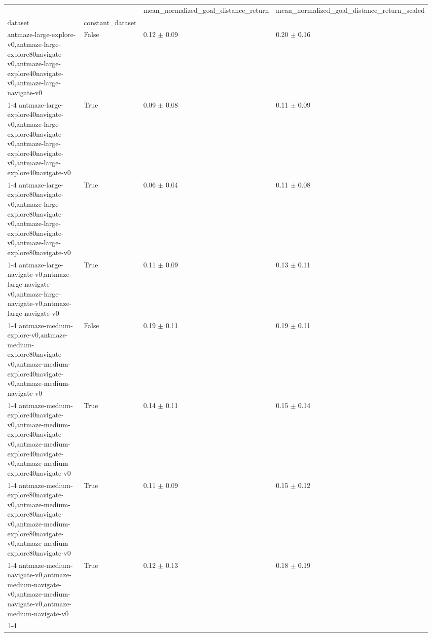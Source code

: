 \begin{tabular}{llll}
\toprule
 &  & mean_normalized_goal_distance_return & mean_normalized_goal_distance_return_scaled \\
dataset & constant_dataset &  &  \\
\midrule
antmaze-large-explore-v0,antmaze-large-explore80navigate-v0,antmaze-large-explore40navigate-v0,antmaze-large-navigate-v0 & False & 0.12 $\pm$ 0.09 & 0.20 $\pm$ 0.16 \\
\cline{1-4}
antmaze-large-explore40navigate-v0,antmaze-large-explore40navigate-v0,antmaze-large-explore40navigate-v0,antmaze-large-explore40navigate-v0 & True & 0.09 $\pm$ 0.08 & 0.11 $\pm$ 0.09 \\
\cline{1-4}
antmaze-large-explore80navigate-v0,antmaze-large-explore80navigate-v0,antmaze-large-explore80navigate-v0,antmaze-large-explore80navigate-v0 & True & 0.06 $\pm$ 0.04 & 0.11 $\pm$ 0.08 \\
\cline{1-4}
antmaze-large-navigate-v0,antmaze-large-navigate-v0,antmaze-large-navigate-v0,antmaze-large-navigate-v0 & True & 0.11 $\pm$ 0.09 & 0.13 $\pm$ 0.11 \\
\cline{1-4}
antmaze-medium-explore-v0,antmaze-medium-explore80navigate-v0,antmaze-medium-explore40navigate-v0,antmaze-medium-navigate-v0 & False & 0.19 $\pm$ 0.11 & 0.19 $\pm$ 0.11 \\
\cline{1-4}
antmaze-medium-explore40navigate-v0,antmaze-medium-explore40navigate-v0,antmaze-medium-explore40navigate-v0,antmaze-medium-explore40navigate-v0 & True & 0.14 $\pm$ 0.11 & 0.15 $\pm$ 0.14 \\
\cline{1-4}
antmaze-medium-explore80navigate-v0,antmaze-medium-explore80navigate-v0,antmaze-medium-explore80navigate-v0,antmaze-medium-explore80navigate-v0 & True & 0.11 $\pm$ 0.09 & 0.15 $\pm$ 0.12 \\
\cline{1-4}
antmaze-medium-navigate-v0,antmaze-medium-navigate-v0,antmaze-medium-navigate-v0,antmaze-medium-navigate-v0 & True & 0.12 $\pm$ 0.13 & 0.18 $\pm$ 0.19 \\
\cline{1-4}
\bottomrule
\end{tabular}
